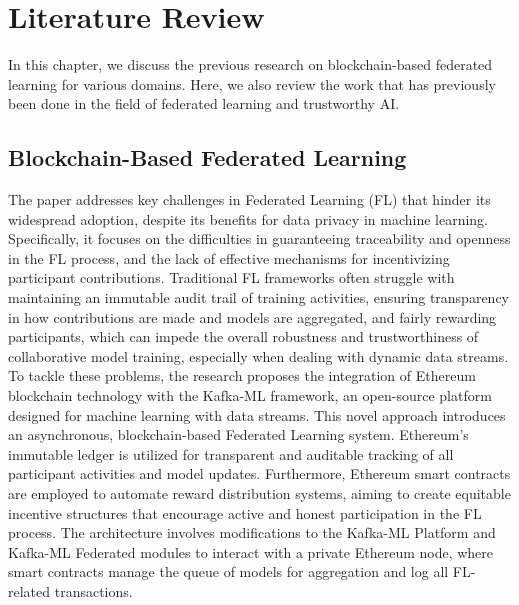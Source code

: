 \chapter{Literature Review}

In this chapter, we discuss the previous research on blockchain-based federated learning for various domains.  Here, we also review the work that has previously been done in the field of federated learning and trustworthy AI.

\section{Blockchain-Based Federated Learning}

 The paper \cite{chaves2024federated} addresses key challenges in Federated Learning (FL) that hinder its widespread adoption, despite its benefits for data privacy in machine learning. Specifically, it focuses on the difficulties in guaranteeing traceability and openness in the FL process, and the lack of effective mechanisms for incentivizing participant contributions. Traditional FL frameworks often struggle with maintaining an immutable audit trail of training activities, ensuring transparency in how contributions are made and models are aggregated, and fairly rewarding participants, which can impede the overall robustness and trustworthiness of collaborative model training, especially when dealing with dynamic data streams. To tackle these problems, the research proposes the integration of Ethereum blockchain technology with the Kafka-ML framework, an open-source platform designed for machine learning with data streams. This novel approach introduces an asynchronous, blockchain-based Federated Learning system. Ethereum's immutable ledger is utilized for transparent and auditable tracking of all participant activities and model updates. Furthermore, Ethereum smart contracts are employed to automate reward distribution systems, aiming to create equitable incentive structures that encourage active and honest participation in the FL process. The architecture involves modifications to the Kafka-ML Platform and Kafka-ML Federated modules to interact with a private Ethereum node, where smart contracts manage the queue of models for aggregation and log all FL-related transactions. 
 
